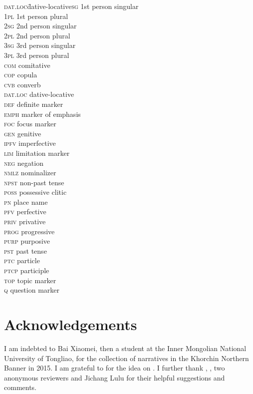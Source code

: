 \documentclass[output=paper,colorlinks,citecolor=brown]{langscibook}
\begin{document}
\begin{multicols}{2}
\begin{tabbing}
\textsc{dat.loc}\hspace{1ex}\= dative-locative\textsc{sg} \> 1st person singular\\
1\textsc{pl} \> 1st person plural\\
2\textsc{sg} \> 2nd person singular\\
2\textsc{pl} \> 2nd person plural\\
3\textsc{sg} \> 3rd person singular\\
3\textsc{pl} \> 3rd person plural\\
\textsc{com} \> comitative\\
\textsc{cop} \> copula\\
\textsc{cvb} \> converb\\
\textsc{dat.loc} \> dative-locative\\
\textsc{def} \> definite marker\\
\textsc{emph} \> marker of emphasis\\
\textsc{foc} \> focus marker\\
\textsc{gen} \> genitive\\
\textsc{ipfv} \> imperfective\\
\textsc{lim} \> limitation marker\\
\textsc{neg} \> negation\\
\textsc{nmlz} \> nominalizer\\
\textsc{npst} \> non-past tense\\
\textsc{poss} \> possessive clitic\\
\textsc{pn} \> place name\\
\textsc{pfv} \> perfective\\
\textsc{priv} \> privative\\
\textsc{prog} \> progressive\\
\textsc{purp} \> purposive\\
\textsc{pst} \> past tense\\
\textsc{ptc} \> particle\\
\textsc{ptcp} \> participle\\
\textsc{top} \> topic marker\\
\textsc{q} \> question marker
\end{tabbing}
\end{multicols}

\section*{Acknowledgements}

I am indebted to Bai Xiaomei, then a student at the Inner Mongolian National University of Tongliao, for the collection of narratives in the Khorchin Northern Banner in 2015. I am grateful to  for the idea on . I further thank , , two anonymous reviewers and Jichang Lulu for their helpful suggestions and comments.\largerpage

{\sloppy\printbibliography[heading=subbibliography,notkeyword=this]}
\end{document}

